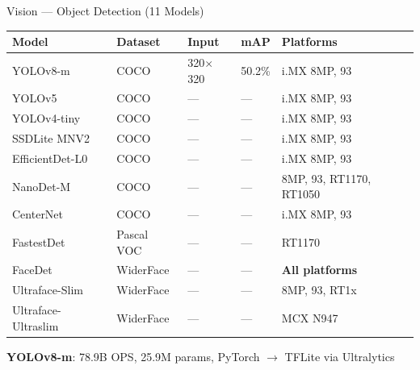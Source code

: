 \documentclass[aspectratio=169]{beamer}
\begin{document}
\begin{frame}{Vision — Object Detection (11 Models)}
  \centering\scriptsize
  \begin{tabular}{llllp{2.8cm}}
    \toprule
    \textbf{Model} & \textbf{Dataset} & \textbf{Input} & \textbf{mAP} & \textbf{Platforms} \\
    \midrule
    \rowcolor{NXPBlue!8}
    YOLOv8-m        & COCO       & 320$\times$320 & \alert{50.2\%} & i.MX 8MP, 93 \\
    YOLOv5          & COCO       & ---            & ---            & i.MX 8MP, 93 \\
    \rowcolor{NXPBlue!8}
    YOLOv4-tiny     & COCO       & ---            & ---            & i.MX 8MP, 93 \\
    SSDLite MNV2    & COCO       & ---            & ---            & i.MX 8MP, 93 \\
    \rowcolor{NXPBlue!8}
    EfficientDet-L0 & COCO       & ---            & ---            & i.MX 8MP, 93 \\
    NanoDet-M       & COCO       & ---            & ---            & 8MP, 93, RT1170, RT1050 \\
    \rowcolor{NXPBlue!8}
    CenterNet       & COCO       & ---            & ---            & i.MX 8MP, 93 \\
    FastestDet      & Pascal VOC & ---            & ---            & RT1170 \\
    \rowcolor{NXPBlue!8}
    FaceDet         & WiderFace  & ---            & ---            & \textbf{All platforms} \\
    Ultraface-Slim  & WiderFace  & ---            & ---            & 8MP, 93, RT1x \\
    \rowcolor{NXPBlue!8}
    Ultraface-Ultraslim & WiderFace & ---         & ---            & MCX N947 \\
    \bottomrule
  \end{tabular}
  \vspace{4pt}
  \textbf{YOLOv8-m}: \alert{78.9B OPS}, 25.9M params, PyTorch $\to$ TFLite via Ultralytics
\end{frame}
\end{document}
